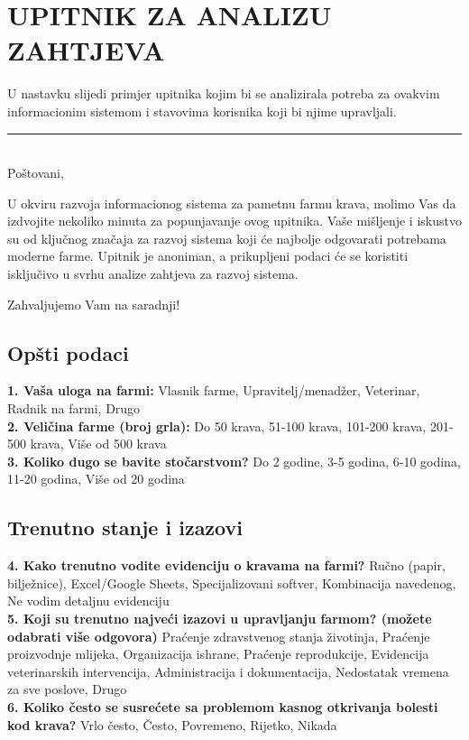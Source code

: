 \documentclass{article}
\begin{document}
\newpage
\section{UPITNIK ZA ANALIZU ZAHTJEVA}

U nastavku slijedi primjer upitnika kojim bi se analizirala potreba za ovakvim informacionim sistemom i stavovima korisnika koji bi njime upravljali.
\\
\rule{\linewidth}{0.4pt}
\\

Poštovani,

U okviru razvoja informacionog sistema za pametnu farmu krava, molimo Vas da izdvojite nekoliko minuta za popunjavanje ovog upitnika. Vaše mišljenje i iskustvo su od ključnog značaja za razvoj sistema koji će najbolje odgovarati potrebama moderne farme. Upitnik je anoniman, a prikupljeni podaci će se koristiti isključivo u svrhu analize zahtjeva za razvoj sistema.

Zahvaljujemo Vam na saradnji!

\subsection{Opšti podaci}

\textbf{1. Vaša uloga na farmi:} Vlasnik farme, Upravitelj/menadžer, Veterinar, Radnik na farmi, Drugo
\\
\textbf{2. Veličina farme (broj grla):} Do 50 krava, 51-100 krava, 101-200 krava, 201-500 krava, Više od 500 krava
\\
\textbf{3. Koliko dugo se bavite stočarstvom?} Do 2 godine, 3-5 godina, 6-10 godina, 11-20 godina, Više od 20 godina

\subsection{Trenutno stanje i izazovi}

\textbf{4. Kako trenutno vodite evidenciju o kravama na farmi?} Ručno (papir, bilježnice), Excel/Google Sheets, Specijalizovani softver, Kombinacija navedenog, Ne vodim detaljnu evidenciju
\\
\textbf{5. Koji su trenutno najveći izazovi u upravljanju farmom? (možete odabrati više odgovora)} Praćenje zdravstvenog stanja životinja, Praćenje proizvodnje mlijeka, Organizacija ishrane, Praćenje reprodukcije, Evidencija veterinarskih intervencija, Administracija i dokumentacija, Nedostatak vremena za sve poslove, Drugo
\\
\textbf{6. Koliko često se susrećete sa problemom kasnog otkrivanja bolesti kod krava?} Vrlo često, Često, Povremeno, Rijetko, Nikada
\end{document}
